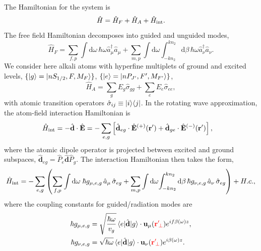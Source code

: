 \documentclass[preprint,aps,pra,onecolumn]{revtex4-1} %
\newcommand{\inter}{{\rm int}}
\newcommand{\error}[1]{{\color{red} #1}}
\begin{document}
The Hamiltonian for the system is
\begin{equation}
\hat{H} = \hat{H}_F+\hat{H}_A + \hat{H}_{\inter}.
\end{equation}
The free field Hamiltonian decomposes into guided and unguided modes, 
	\begin{equation}
		\hat{H}_F = \sum_{f,p}\int \mathrm{d}\omega \, \hbar \omega \hat{a}^\dagger_\mu \hat{a}_\mu 
+\sum_{m,p} \int \mathrm{d}\omega  \int_{-k n_2}^{k n_2} \mathrm{d}\beta \, \hbar \omega 
\hat{a}^\dagger_\nu \hat{a}_\nu.
	\end{equation}
We consider here alkali atoms with hyperfine multiplets of ground and excited levels, $\{ 
\lvert{g}\rangle=\lvert{nS_{1/2}, F, M_F}\rangle\}$, $\{ \lvert{e}\rangle =\lvert{nP_{J'}, F', M_{F'}}\rangle\}$,
	\begin{equation}
		\hat{H}_A  = \sum_g E_g \hat{\sigma}_{gg} + \sum_e E_e \hat{\sigma}_{ee},
	\end{equation}
with atomic transition operators $\hat{\sigma}_{ij} \equiv \lvert{i}\rangle\langle{j}\rvert$.  In the rotating wave approximation, the atom-field interaction Hamiltonian is
	\begin{align}
		\hat{H}_{\inter} &= -\hat{\mathbf{d}}\cdot \hat{\mathbf{E}} =- \sum_{e,g} \left[ \hat{\mathbf{d}}_{eg}\cdot 
\hat{\mathbf{E}}^{(+)}(\br')+\hat{\mathbf{d}}_{ge}\cdot \hat{\mathbf{E}}^{(-)}(\br') \right],
	\end{align}
where the atomic dipole operator is projected between excited and ground subspaces, $\hat{\mathbf{d}}_{eg}= \hat{P}_e \hat{\mathbf{d}} \hat{P}_g $. The interaction Hamiltonian then takes the form, 
\begin{equation}
	\hat{H}_{\inter} = -\sum_{e,g} \left(\sum_{f,p} \int\mathrm{d}\omega \; \hbar g_{\mu, e,g}\, \hat{a}_\mu  \, 
		\hat{\sigma}_{eg}+ \sum_{m,p} \int\mathrm{d}\omega \! \int_{-kn_2}^{kn_2}\mathrm{d}\beta \,  \hbar 
g_{\nu, e,g}\, \hat{a}_\nu \, \hat{\sigma}_{eg}\right) + {H.c.},
	\end{equation}
where the coupling constants for guided/radiation modes are
\begin{subequations} \label{Eq::CouplingConstants}
	\begin{align}
		\hbar g_{\mu, e,g} &= \sqrt{\frac{\hbar \omega}{ v_g  }}\, \bra{e} \hat{\mathbf{d}} \ket{g} 
\cdot\mathbf{u}_\mu ( \error{\br'\!_\perp} ) e^{i f \beta(\omega)z} , \\
		\hbar g_{\nu, e,g} &= \sqrt{  \hbar \omega } \, \bra{e} \hat{\mathbf{d}} \ket{g} \cdot \mathbf{u}_\nu ( \error{ \br'\!_\perp} ) e^{i\beta(\omega)z}  .
	\end{align}
\end{subequations}
\end{document}
